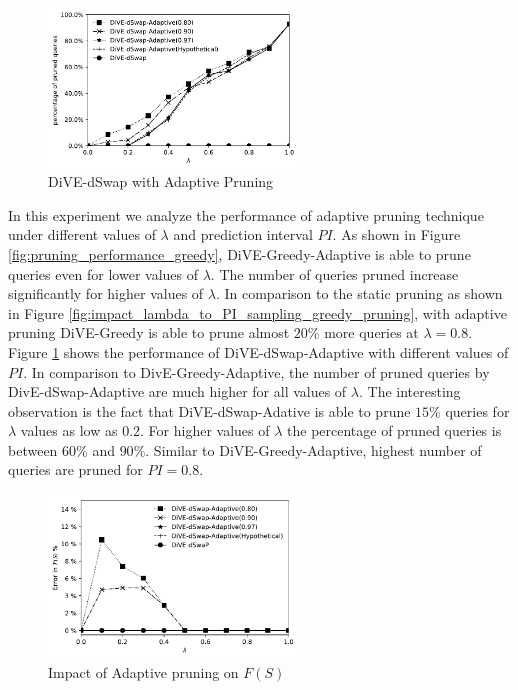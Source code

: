 \begin{figure}[t]
	\includegraphics[width=2.6in]{figures/results/pruning_performance_dswap_adaptive}
				\vspace{-15pt}
	\caption{DiVE-dSwap with Adaptive Pruning}%
	\label{fig:impact_lambda_to_PI_sampling_swapd_pruning}
\end{figure}



{}
In this experiment we analyze the performance of adaptive pruning technique under different values of $\lambda$ and prediction interval $PI$. As shown in Figure \ref{fig:pruning_performance_greedy}, DiVE-Greedy-Adaptive is able to prune queries even for lower values of $\lambda$. The number of queries pruned increase significantly for higher values of $\lambda$. In comparison to the static pruning as shown in Figure \ref{fig:impact_lambda_to_PI_sampling_greedy_pruning}, with adaptive pruning DiVE-Greedy is able to prune almost $20\%$ more queries at $\lambda = 0.8$. Figure \ref{fig:impact_lambda_to_PI_sampling_swapd_pruning} shows the performance of DiVE-dSwap-Adaptive with different values of $ PI $. In comparison to DivE-Greedy-Adaptive, the number of pruned queries by DivE-dSwap-Adaptive are much higher for all values of $\lambda$. The interesting observation is the fact that DiVE-dSwap-Adative is able to prune $15\%$ queries for $\lambda$ values as low as $0.2$. For higher values of $\lambda$ the percentage of pruned queries is between $60\%$ and $90\%$. Similar to DiVE-Greedy-Adaptive, highest number of queries are pruned for $PI=0.8$. 
	

\begin{figure}[t]
	\includegraphics[width=2.6in]{figures/results/error_f_s}
				\vspace{-15pt}
	\caption{Impact of Adaptive pruning on $F(S)$}
	\label{fig:pruning_performance_swapd}
\end{figure}

